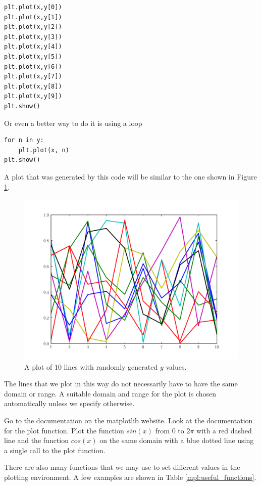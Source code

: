 \begin{lstlisting}
plt.plot(x,y[0])
plt.plot(x,y[1])
plt.plot(x,y[2])
plt.plot(x,y[3])
plt.plot(x,y[4])
plt.plot(x,y[5])
plt.plot(x,y[6])
plt.plot(x,y[7])
plt.plot(x,y[8])
plt.plot(x,y[9])
plt.show()
\end{lstlisting}
Or even a better way to do it is using a loop
\begin{lstlisting}
for n in y:
    plt.plot(x, n)
plt.show()
\end{lstlisting}

A plot that was generated by this code will be similar to the one shown in Figure \ref{mpl:statemachineexample}.

\begin{figure}
\includegraphics[width=\textwidth]{statemachine.pdf}
\caption{A plot of $10$ lines with randomly generated $y$ values.}
\label{mpl:statemachineexample}
\end{figure}

The lines that we plot in this way do not necessarily have to have the same domain or range.
A suitable domain and range for the plot is chosen automatically unless we specify otherwise.

\begin{problem}
Go to the documentation on the matplotlib website.
Look at the documentation for the plot function.
Plot the function $sin(x)$ from $0$ to $2\pi$ with a red dashed line and the function $cos(x)$ on the same domain with a blue dotted line using a single call to the plot function.
\end{problem}

There are also many functions that we may use to set different values in the plotting environment.
A few examples are shown in Table \ref{mpl:useful_functions}.


